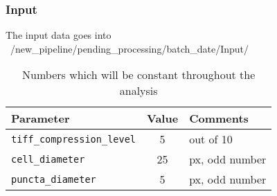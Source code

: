 \begin{comment}
Press [Enter] to skip some steps and get the ssh key. Then, copy the entire block of string from start to finish, including the \_ssh-rsa\_ and the ending name . Use `cat /u/username/.ssh/id\_rsa.pub` and change **user\_path** accordingly

Sign-in to GitHub, https://github.com/login

Paste the key into GitHub, https://github.com/settings/keys

\begin{itemize}
    \item New SSH key
    \item Type in the cluster name as **Title** and paste the key under **Key**
\end{itemize}

Create a directory to save the pipeline scripts

\begin{verbatim}
mkdir dynamics\_pipeline
cd dynamics\_pipeline
\end{verbatim}

Paste the following in the terminal to clone the pipeline:

\begin{verbatim}
git init
git remote add origin git@github.com:MJ-Taylor-Lab/DynamicsPipeline.git
git remote set-url origin git@github.com:MJ-Taylor-Lab/DynamicsPipeline.git
git fetch --all
git pull origin master
\end{verbatim}

---
\subsection*{Image Analysis Pipeline}
\end{comment}

\subsubsection*{Input}
The input data goes into ~/new\_pipeline/pending\_processing/batch\_date/Input/

\begin{table}[htb]
  \centering
  \caption{Numbers which will be constant throughout the analysis}
  \label{tab:constants}
  \begin{tabular}{ | l | c | p{5cm} | }
    \hline
    \textbf{Parameter} & \textbf{Value} & \textbf{Comments} \\ \hline
    \texttt{tiff\_compression\_level} & 5 & out of 10 \\ \hline
    \texttt{cell\_diameter} & 25 & px, odd number \\ \hline
    \texttt{puncta\_diameter} & 5 & px, odd number \\ \hline
  \end{tabular}
\end{table}

